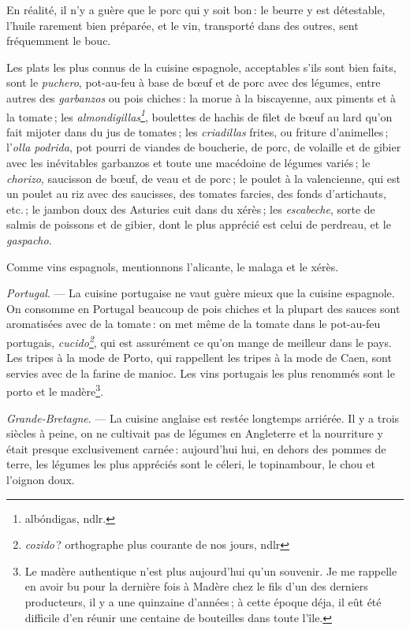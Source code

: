 En réalité, il n'y a guère que le porc qui y soit bon : le beurre y est
détestable, l'huile rarement bien préparée, et le vin, transporté dans des
outres, sent fréquemment le bouc.

Les plats les plus connus de la cuisine espagnole, acceptables s'ils sont bien
faits, sont le \textit{puchero}, pot-au-feu à base de bœuf et de porc avec des
légumes, entre autres des \textit{garbanzos} ou pois chiches : la morue à la
biscayenne, aux piments et à la tomate ; les
\textit{almondigillas\footnote{albóndigas, ndlr.}}, boulettes de hachis
de filet de bœuf au lard qu'on fait mijoter dans du jus de tomates ; les
\textit{criadillas} frites, ou friture d'animelles ; l'\textit{olla podrida},
pot pourri de viandes de boucherie, de porc, de volaille et de gibier avec les
inévitables garbanzos et toute une macédoine de légumes variés ; le
\textit{chorizo}, saucisson de bœuf, de veau et de porc ; le poulet à la
valencienne, qui est un poulet au riz avec des saucisses, des tomates farcies,
des fonds d'artichauts, etc. ; le jambon doux des Asturies cuit dans du xérès ;
les \textit{escabeche}, sorte de salmis de poissons et de gibier, dont le plus
apprécié est celui de perdreau, et le \textit{gaspacho}.

Comme vins espagnols, mentionnons l'alicante, le malaga et le xérès.

\textit{Portugal}. — La cuisine portugaise ne vaut guère mieux que la cuisine
espagnole. On consomme en Portugal beaucoup de pois chiches et la plupart des
sauces sont aromatisées avec de la tomate : on met même de la tomate dans le
pot-au-feu portugais, \textit{cucido\footnote{\textit{cozido} ? orthographe
plus courante de nos jours, ndlr}}, qui est assurément ce qu'on mange de
meilleur dans le pays. Les tripes à la mode de Porto, qui rappellent les tripes
à la mode de Caen, sont servies avec de la farine de manioc. Les vins portugais
les plus renommés sont le porto et le madère\footnote{Le madère authentique
n'est plus aujourd'hui qu'un souvenir. Je me rappelle en avoir bu pour la
dernière fois à Madère chez le fils d'un des derniers producteurs, il y a une
quinzaine d'années ; à cette époque déja, il eût été difficile d'en réunir une
centaine de bouteilles dans toute l'île.}.

\sk 

\textit{Grande-Bretagne}. — La cuisine anglaise est restée longtemps arriérée.
Il y a trois siècles à peine, on ne cultivait pas de légumes en Angleterre et
la nourriture y était presque exclusivement carnée : aujourd'hui hui, en dehors des
pommes de terre, les légumes les plus appréciés sont le céleri, le topinambour,
le chou et l'oignon doux.


